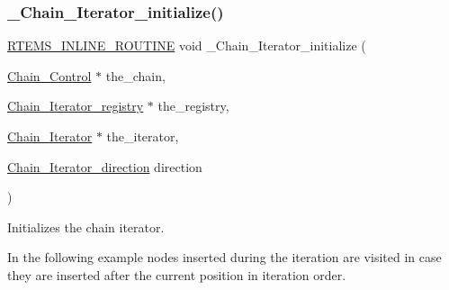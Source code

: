 \subsubsection{\texorpdfstring{\_Chain\_Iterator\_initialize()}{\_Chain\_Iterator\_initialize()}}
{\footnotesize\ttfamily \mbox{\hyperlink{group__RTEMSScoreBaseDefs_gac216239df231d5dbd15e3520b0b9313f}{R\+T\+E\+M\+S\+\_\+\+I\+N\+L\+I\+N\+E\+\_\+\+R\+O\+U\+T\+I\+NE}} void \+\_\+\+Chain\+\_\+\+Iterator\+\_\+initialize (\begin{DoxyParamCaption}\item[{\mbox{\hyperlink{unionChain__Control}{Chain\+\_\+\+Control}} $\ast$}]{the\+\_\+chain,  }\item[{\mbox{\hyperlink{structChain__Iterator__registry}{Chain\+\_\+\+Iterator\+\_\+registry}} $\ast$}]{the\+\_\+registry,  }\item[{\mbox{\hyperlink{structChain__Iterator}{Chain\+\_\+\+Iterator}} $\ast$}]{the\+\_\+iterator,  }\item[{\mbox{\hyperlink{group__RTEMSScoreChain_gac754c64a6c8a46b7b17cf3b7ac33124b}{Chain\+\_\+\+Iterator\+\_\+direction}}}]{direction }\end{DoxyParamCaption})}



Initializes the chain iterator. 

In the following example nodes inserted during the iteration are visited in case they are inserted after the current position in iteration order.


